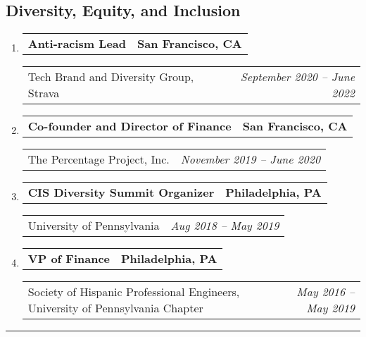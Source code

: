 \documentclass[letterpaper]{article}
\makeatletter
\newif\iflong
\newcommand*{\tabulardef}[3]{\begin{tabular}[t]{@{}lp{\dimexpr\linewidth-#1}@{}}
    #2&#3
\end{tabular}}
\newcommand{\headerrow}[2]
{\begin{tabular*}{\linewidth}{l@{\extracolsep{\fill}}r}
	#1 &
	#2 \\
\end{tabular*}}
\makeatother
\begin{document}
\subsection*{Diversity, Equity, and Inclusion}
\begin{enumerate}[label=]
	\parskip=-0.05em
	\item
		\headerrow
			{\textbf{Anti-racism Lead}}
			{\textbf{San Francisco, CA}}
	\headerrow
		{Tech Brand and Diversity Group, Strava}
		{\emph{September 2020 -- June 2022}}
    \iflong
	\begin{enumerate}[label= *]
	\parskip=-0.1em
		\item\tabulardef{5cm}{}{Lead a group in the technology organization focused on initiatives that could be taken to support diversity, equity, and inclusion, and anti-racism}
	\end{enumerate}
    \fi

	\item
		\headerrow
			{ \textbf{Co-founder and Director of Finance}}
			{\textbf{San Francisco, CA}}
	\headerrow
		{The Percentage Project, Inc.}
		{\emph{November 2019 -- June 2020}}
    \iflong
	\begin{enumerate}[label= *]
	\parskip=-0.1em
		\item\tabulardef{5cm}{}{Kickstarted financial and accounting systems for nonprofit organization dedicated to helping every person of every background embrace their diversity and feel a sense of belonging in the field that they pursue}
	\end{enumerate}
    \fi

	\item
		\headerrow
			{\textbf{CIS Diversity Summit Organizer}}
			{\textbf{Philadelphia, PA}}
	\headerrow
		{University of Pennsylvania}
		{\emph{Aug 2018 -- May 2019}}
    \iflong
	\begin{enumerate}[label= *]
	\parskip=-0.1em
		\item\tabulardef{5cm}{}{Collaborate in organizing a summit bringing together all members of the computer and information science community to determine how to work together to create a more diverse, inclusive, and supportive environment}
	\end{enumerate}
    \fi

	\item
		\headerrow
			{\textbf{VP of Finance}}
			{\textbf{Philadelphia, PA}}
	\headerrow
		{Society of Hispanic Professional Engineers, University of Pennsylvania Chapter}
		{\emph{May 2016 -- May 2019}}
    \iflong
	\begin{enumerate}[label= *]
	\parskip=-0.1em
		\item\tabulardef{5cm}{}{Fundraise and organize bringing student members to the SHPE National Convention}
	\end{enumerate}
    \fi
\end{enumerate}
\hrule
\end{document}
